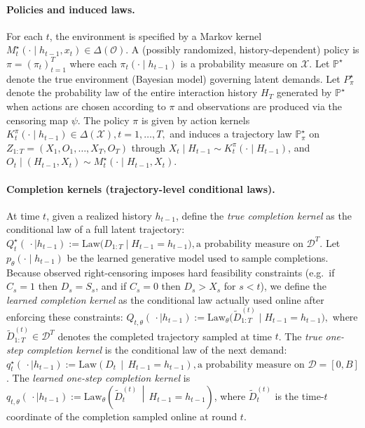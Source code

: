 \documentclass[11pt]{article}
\renewcommand{\P}{\mathbb{P}}
\begin{document}
\paragraph{Policies and induced laws.}
For each \(t\), the environment is specified by a Markov kernel
\(M^\star_t(\cdot \mid h_{t-1},x_t)\in\Delta(\mathcal{O}).\)
A (possibly randomized, history-dependent) policy is $\pi=(\pi_t)_{t=1}^T$ where each
$\pi_t(\cdot\mid h_{t-1})$ is a probability measure on $\mathcal{X}$.
Let $\P^\star$ denote the true environment (Bayesian model) governing latent demands.
Let $P_{\pi}^\star$ denote the probability law of the entire interaction history $H_T$
generated by $\P^\star$ when actions are chosen according to $\pi$ and observations are produced
via the censoring map $\psi$. The policy \(\pi\) is given by action kernels
\(
K^{\pi}_t(\cdot \mid h_{t-1})\in\Delta(\mathcal{X}), t=1,\dots,T,
\)
and induces a trajectory law \(\P^\star_{\pi}\) on \(Z_{1:T}=(X_1,O_1,\dots,X_T,O_T)\) through
\(
X_t \mid H_{t-1}\sim K^{\pi}_t(\cdot\mid H_{t-1})\), and
\(O_t \mid (H_{t-1},X_t)\sim M^\star_t(\cdot\mid H_{t-1},X_t).
\)

\paragraph{Completion kernels (trajectory-level conditional laws).}
At time $t$, given a realized history $h_{t-1}$, define the \emph{true completion kernel}
as the conditional law of a full latent trajectory:
$Q_t^\star(\,\cdot \mid h_{t-1}) := \mathrm{Law}\bigl(D_{1:T}\mid H_{t-1}=h_{t-1}\bigr), \text{a probability measure on }\mathcal{D}^T$. Let $p_\theta(\cdot\mid h_{t-1})$ be the learned generative model used to sample completions. Because observed right-censoring imposes hard feasibility constraints (e.g.\ if $C_s=1$ then $D_s=S_s$, and if $C_s=0$ then $D_s>X_s$ for $s<t$), we define the
\emph{learned completion kernel} as the conditional law actually used online after enforcing
these constraints: \(Q_{t,\theta}(\,\cdot \mid h_{t-1}) := \mathrm{Law}_\theta\bigl(\widetilde D_{1:T}^{(t)} \mid H_{t-1}=h_{t-1}\bigr),\)
where $\widetilde D_{1:T}^{(t)}\in\mathcal{D}^T$ denotes the completed trajectory sampled at time $t$. The \emph{true one-step completion kernel} is the conditional law of the next demand:
\(q_t^\star(\,\cdot \mid h_{t-1})
:= \mathrm{Law}\!\left( D_t \,\middle|\, H_{t-1}=h_{t-1}\right), \text{a probability measure on }\mathcal{D}=[0,B]\). The \emph{learned one-step completion kernel} is
\(q_{t,\theta}(\,\cdot \mid h_{t-1})
:= \mathrm{Law}_{\theta}\!\left(\widetilde D_t^{(t)} \,\middle|\, H_{t-1}=h_{t-1}\right)\), where $\widetilde D_t^{(t)}$ is the time-$t$ coordinate of the completion sampled online at round $t$.
\end{document}
